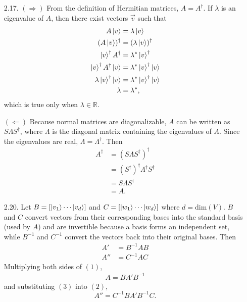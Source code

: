 \documentclass[a4paper,12pt]{article}
\begin{document}
\begin{enumerate}
	\item[2.17.] $(\Rightarrow)$ From the definition of Hermitian matrices, $A = A^\dagger$. If $\lambda$ is an eigenvalue of $A$, then there exist vectors $\vec{v}$ such that
	\begin{align*}
		A \ket{v} &= \lambda \ket{v} \\
		(A \ket{v})^\dagger &= (\lambda \ket{v})^\dagger \\
		\ket{v}^\dagger A^\dagger &= \lambda^* \ket{v}^\dagger \\
		\ket{v}^\dagger A^\dagger \ket{v} &= \lambda^* \ket{v}^\dagger \ket{v} \\
		\lambda \ket{v}^\dagger \ket{v} &= \lambda^* \ket{v}^\dagger \ket{v} \\
		\lambda &= \lambda^*,
	\end{align*}
	which is true only when $\lambda \in \mathbb{R}$. \par
	$(\Leftarrow)$ Because normal matrices are diagonalizable, $A$ can be written as $S \Lambda S^\dagger$, where $\Lambda$ is the diagonal matrix containing the eigenvalues of $A$. Since the eigenvalues are real, $\Lambda = \Lambda^\dagger$. Then
	\begin{align*}
		A^\dagger &= (S \Lambda S^\dagger)^\dagger \\
		&= (S^\dagger)^\dagger \Lambda^\dagger S^\dagger \\
		&= S \Lambda S^\dagger \\
		&= A.
	\end{align*}
	
	\item[2.20.] Let $B = [ \ket{v_1} \cdots \ket{v_d} ]$ and $C = [ \ket{w_1} \cdots \ket{w_d} ]$ where $d = \mbox{dim}(V)$. $B$ and $C$ convert vectors from their corresponding bases into the standard basis (used by $A$) and are invertible because a basis forms an independent set, while $B^{-1}$ and $C^{-1}$ convert the vectors back into their original bases. Then
	\begin{align}
		A' &= B^{-1} A B \\
		A'' &= C^{-1} A C
	\end{align}
	Multiplying both sides of $(1)$,
	\begin{align}
		A = B A' B^{-1}
	\end{align}
	and substituting $(3)$ into $(2)$,
	\[ A'' = C^{-1} B A' B^{-1} C. \]
	

\end{enumerate}
\end{document}
